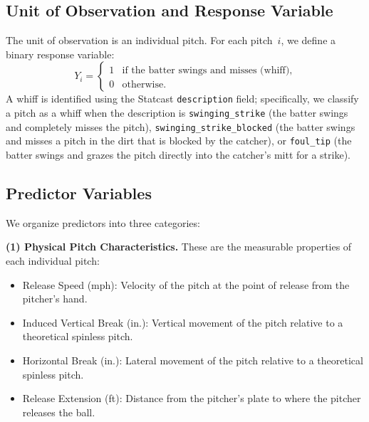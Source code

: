 \documentclass[11pt]{article}
\begin{document}
\subsection{Unit of Observation and Response Variable}

The unit of observation is an individual pitch.
For each pitch~$i$, we define a binary response variable:
\[
   Y_i =
   \begin{cases}
   1 & \text{if the batter swings and misses (whiff)}, \\
   0 & \text{otherwise}.
   \end{cases}
\]
A whiff is identified using the Statcast \texttt{description} field; specifically, 
we classify a pitch as a whiff when the description is \texttt{swinging\_strike} 
(the batter swings and completely misses the pitch), \texttt{swinging\_strike\_blocked} 
(the batter swings and misses a pitch in the dirt that is blocked by the catcher), 
or \texttt{foul\_tip} (the batter swings and grazes the pitch directly into 
the catcher's mitt for a strike).

\subsection{Predictor Variables}

We organize predictors into three categories:

\medskip
\noindent\textbf{(1) Physical Pitch Characteristics.}
These are the measurable properties of each individual pitch:
\begin{itemize}[nosep]
    \item Release Speed (mph): Velocity of the pitch at the point of release from the pitcher's hand.
    \item Induced Vertical Break (in.): Vertical movement of the pitch relative to a theoretical spinless pitch.
    \item Horizontal Break (in.): Lateral movement of the pitch relative to a theoretical spinless pitch.
    \item Release Extension (ft): Distance from the pitcher's plate to where the pitcher releases the ball.
\end{itemize}
\end{document}
